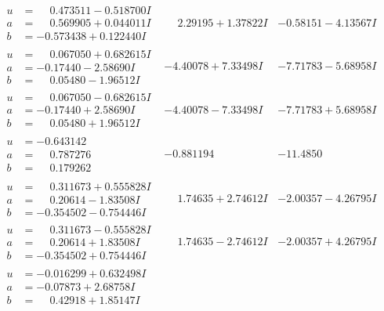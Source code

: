 \documentclass[1p]{elsarticle_modified}
\theoremstyle{definition}
\begin{document}
$$\begin{array}{c|c|c}
\begin{aligned}
u &= \phantom{-}0.473511 - 0.518700 I \\
a &= \phantom{-}0.569905 + 0.044011 I \\
b &= -0.573438 + 0.122440 I\end{aligned}
 & \phantom{-}2.29195 + 1.37822 I & -0.58151 - 4.13567 I \\ \hline\begin{aligned}
u &= \phantom{-}0.067050 + 0.682615 I \\
a &= -0.17440 - 2.58690 I \\
b &= \phantom{-}0.05480 - 1.96512 I\end{aligned}
 & -4.40078 + 7.33498 I & -7.71783 - 5.68958 I \\ \hline\begin{aligned}
u &= \phantom{-}0.067050 - 0.682615 I \\
a &= -0.17440 + 2.58690 I \\
b &= \phantom{-}0.05480 + 1.96512 I\end{aligned}
 & -4.40078 - 7.33498 I & -7.71783 + 5.68958 I \\ \hline\begin{aligned}
u &= -0.643142\phantom{ +0.000000I} \\
a &= \phantom{-}0.787276\phantom{ +0.000000I} \\
b &= \phantom{-}0.179262\phantom{ +0.000000I}\end{aligned}
 & -0.881194\phantom{ +0.000000I} & -11.4850\phantom{ +0.000000I} \\ \hline\begin{aligned}
u &= \phantom{-}0.311673 + 0.555828 I \\
a &= \phantom{-}0.20614 - 1.83508 I \\
b &= -0.354502 - 0.754446 I\end{aligned}
 & \phantom{-}1.74635 + 2.74612 I & -2.00357 - 4.26795 I \\ \hline\begin{aligned}
u &= \phantom{-}0.311673 - 0.555828 I \\
a &= \phantom{-}0.20614 + 1.83508 I \\
b &= -0.354502 + 0.754446 I\end{aligned}
 & \phantom{-}1.74635 - 2.74612 I & -2.00357 + 4.26795 I \\ \hline\begin{aligned}
u &= -0.016299 + 0.632498 I \\
a &= -0.07873 + 2.68758 I \\
b &= \phantom{-}0.42918 + 1.85147 I\end{aligned}

\end{array}$$
\end{document}
